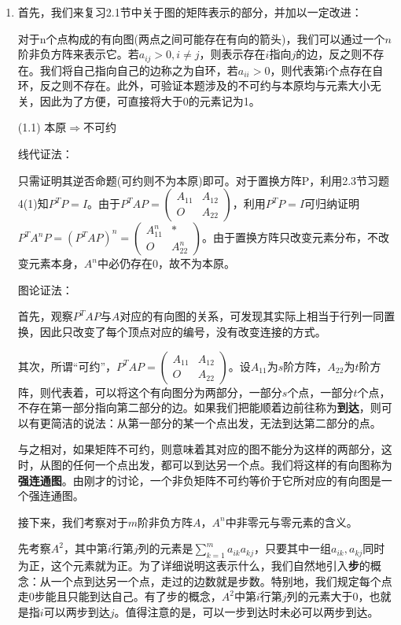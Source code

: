 \documentclass[a4paper,UTF8,fontset=windows]{ctexart}
\begin{document}
\begin{enumerate}
\item
首先，我们来复习2.1节中关于图的矩阵表示的部分，并加以一定改进：

对于n个点构成的有向图(两点之间可能存在有向的箭头)，我们可以通过一个$n$阶非负方阵来表示它。若$a_{ij}>0,i\ne j$，则表示存在$i$指向$j$的边，反之则不存在。我们将自己指向自己的边称之为自环，若$a_{ii}>0$，则代表第i个点存在自环，反之则不存在。此外，可验证本题涉及的不可约与本原均与元素大小无关，因此为了方便，可直接将大于0的元素记为1。

(1.1) 本原$\Rightarrow$不可约

线代证法：

只需证明其逆否命题(可约则不为本原)即可。对于置换方阵P，利用2.3节习题4(1)知$P^TP=I$。由于$P^TAP=\begin{pmatrix}A_{11}&A_{12}\\O&A_{22}\end{pmatrix}$，利用$P^TP=I$可归纳证明$P^TA^nP=(P^TAP)^n=\begin{pmatrix}A_{11}^n&\ast\\O&A_{22}^n\end{pmatrix}$。由于置换方阵只改变元素分布，不改变元素本身，$A^n$中必仍存在0，故不为本原。

图论证法：

首先，观察$P^TAP$与$A$对应的有向图的关系，可发现其实际上相当于行列一同置换，因此只改变了每个顶点对应的编号，没有改变连接的方式。

其次，所谓“可约”，$P^TAP=\begin{pmatrix}A_{11}&A_{12}\\O&A_{22}\end{pmatrix}$。设$A_{11}$为$s$阶方阵，$A_{22}$为$t$阶方阵，则代表着，可以将这个有向图分为两部分，一部分$s$个点，一部分$t$个点，不存在第一部分指向第二部分的边。如果我们把能顺着边前往称为\textbf{到达}，则可以有更简洁的说法：从第一部分的某一个点出发，无法到达第二部分的点。

与之相对，如果矩阵不可约，则意味着其对应的图不能分为这样的两部分，这时，从图的任何一个点出发，都可以到达另一个点。我们将这样的有向图称为\textbf{强连通图}。由刚才的讨论，一个非负矩阵不可约等价于它所对应的有向图是一个强连通图。

接下来，我们考察对于$m$阶非负方阵$A$，$A^n$中非零元与零元素的含义。

先考察$A^2$，其中第$i$行第$j$列的元素是$\sum_{k=1}^{m}{a_{ik}a_{kj}}$，只要其中一组$a_{ik},a_{kj}$同时为正，这个元素就为正。为了详细说明这表示什么，我们自然地引入\textbf{步}的概念：从一个点到达另一个点，走过的边数就是步数。特别地，我们规定每个点走0步能且只能到达自己。有了步的概念，$A^2$中第$i$行第$j$列的元素大于0，也就是指$i$可以两步到达$j$。值得注意的是，可以一步到达时未必可以两步到达。


\end{enumerate}
\end{document}
